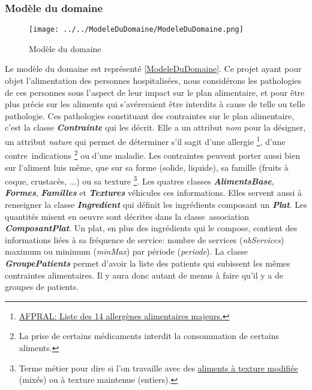 \subsubsection{Modèle du domaine}
\begin{figure}
  \centering
      \texttt{[image: ../../ModeleDuDomaine/ModeleDuDomaine.png]} %
\caption{Modèle du domaine}
\label{ModeleDuDomaine}
\end{figure}

\newcommand{\classe}[1]{\emph{\textbf{#1}}}
\newcommand{\attribut}[1]{\emph{#1}}
\newcommand{\regleD}[1]{\textcolor{NavyBlue}{#1}}
\newcommand{\regleT}[1]{\textcolor{ForestGreen}{#1}}

Le modèle du domaine est représenté \autoref{ModeleDuDomaine}. Ce projet ayant pour objet l'alimentation des personnes hospitalisées, nous considérons les pathologies de ces personnes sous l'aspect de leur impact sur le plan alimentaire, et pour être plus précis sur les aliments qui s'avéreraient être interdits à cause de telle ou telle pathologie. Ces pathologies constituant des contraintes sur le plan alimentaire, c'est la classe \classe{Contrainte} qui les décrit. Elle a un attribut \attribut{nom} pour la désigner, un attribut \attribut{nature} qui permet de déterminer s'il sagit d'une allergie
\footnote{\label{allergies}\href{https://allergies.afpral.fr/allergie/en-savoir-plus-sur-les-allergies/alimentaires/89-liste-des-14-allergenes-alimentaires-majeurs}{AFPRAL: Liste des 14 allergènes alimentaires majeurs.}},
d'une contre~indications
\footnote{\label{contreIndications}La prise de certains médicaments interdit la consommation de certains aliments.}
ou d'une maladie.
Les contraintes peuvent porter aussi bien sur l'aliment luis même, que sur sa forme (solide, liquide), sa famille (fruits à coque, crustacès, ...) ou sa texture
\footnote{\label{textures}Terme métier pour dire si l'on travaille avec des \href{http://plone.vermeil.org:8080/ehpad/Bibliotheque/Memoires/annee-2012-2013/07 - Les textures modifiees et le plaisir de manger de Jacques Caby.pdf}{aliments à texture modifiée} (mixés) ou à texture maintenue (entiers).}.
Les quatres classes \classe{AlimentsBase}, \classe{Formes}, \classe{Familles} et \classe{Textures} véhicules ces informations. Elles servent aussi à renseigner la classe \classe{Ingredient} qui définit les ingrédients composant un \classe{Plat}. Les quantités misent en oeuvre sont décrites dans la classe~association \classe{ComposantPlat}. Un plat, en plus des ingrédients qui le compose, contient des informations liées à sa fréquence de service: nombre de services (\attribut{nbServices}) maximum ou minimum (\attribut{minMax}) par période (\attribut{periode}).
La classe \classe{GroupePatients} permet d'avoir la liste des patients qui subissent les mêmes contraintes alimentaires. Il y aura donc autant de menus à faire qu'il y a de groupes de patients.

